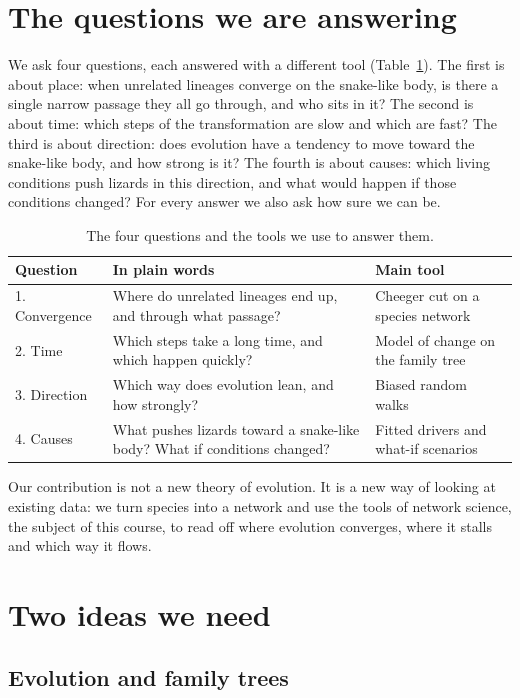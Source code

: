 \documentclass[11pt]{article}
\begin{document}
\section{The questions we are answering}

We ask four questions, each answered with a different tool (Table~\ref{tab:questions}). The first is about place: when unrelated lineages converge on the snake-like body, is there a single narrow passage they all go through, and who sits in it? The second is about time: which steps of the transformation are slow and which are fast? The third is about direction: does evolution have a tendency to move toward the snake-like body, and how strong is it? The fourth is about causes: which living conditions push lizards in this direction, and what would happen if those conditions changed? For every answer we also ask how sure we can be.

\begin{table}[h]
\centering
\small
\begin{tabularx}{\textwidth}{@{}lXl@{}}
\toprule
Question & In plain words & Main tool \\
\midrule
1. Convergence & Where do unrelated lineages end up, and through what passage? & Cheeger cut on a species network \\
2. Time & Which steps take a long time, and which happen quickly? & Model of change on the family tree \\
3. Direction & Which way does evolution lean, and how strongly? & Biased random walks \\
4. Causes & What pushes lizards toward a snake-like body? What if conditions changed? & Fitted drivers and what-if scenarios \\
\bottomrule
\end{tabularx}
\caption{The four questions and the tools we use to answer them.}
\label{tab:questions}
\end{table}

Our contribution is not a new theory of evolution. It is a new way of looking at existing data: we turn species into a network and use the tools of network science, the subject of this course, to read off where evolution converges, where it stalls and which way it flows.

\section{Two ideas we need}

\subsection{Evolution and family trees}
\end{document}
